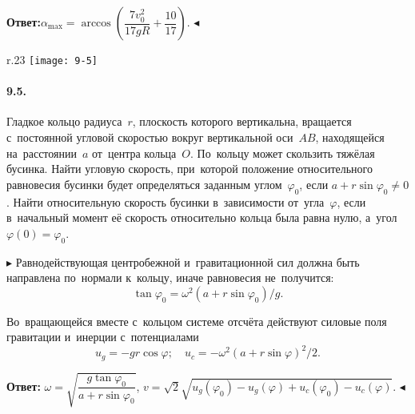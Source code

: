 \documentclass{weekly}
\begin{document}
\medskip
\textbf{Ответ:}\qquad $\alpha_{\max} =
\arccos \left( \dfrac{7v_0^2}{17gR} + \dfrac{10}{17} \right)$.
\hfill $\blacktriangleleft$


\begin{wrapfigure}{r}{.23\textwidth}\vspace{-5mm}
\texttt{[image: 9-5]}
\end{wrapfigure}
\paragraph{9.5.} Гладкое кольцо радиуса~$r$, плоскость которого
вертикальна, вращается с~постоянной угловой скоростью вокруг
вертикальной оси~$AB$, находящейся на~расстоянии~$a$
от~центра кольца~$O$. По~кольцу может скользить тяжёлая бусинка.
Найти угловую скорость, при~которой положение относительного
равновесия бусинки будет определяться заданным углом~$\varphi_0$,
если $a + r\sin\varphi_0 \neq 0$. Найти относительную скорость
бусинки в~зависимости от~угла~$\varphi$, если в~начальный момент
её скорость относительно кольца была равна нулю,
а~угол~$\varphi(0) = \varphi_0$.

$\blacktriangleright$ Равнодействующая центробежной и~гравитационной
сил должна быть направлена по~нормали к~кольцу, иначе равновесия
не~получится:
\begin{equation}
    \tan\varphi_0 = \omega^2(a + r\sin\varphi_0)/g.
\end{equation}

Во~вращающейся вместе с~кольцом системе отсчёта действуют
силовые поля гравитации и~инерции с~потенциалами
\begin{equation}
    u_g = -gr\cos\varphi; \quad
    u_c = -\omega^2 (a + r\sin\varphi)^2/2.
\end{equation}

\textbf{Ответ:}\qquad
$\omega = \sqrt{\dfrac{g \tan\varphi_0}{a + r\sin\varphi_0}}$,
\quad
$v = \sqrt{2} \sqrt{u_g(\varphi_0) - u_g(\varphi)
    + u_c(\varphi_0) - u_c(\varphi)}$.
\hfill $\blacktriangleleft$
\end{document}

